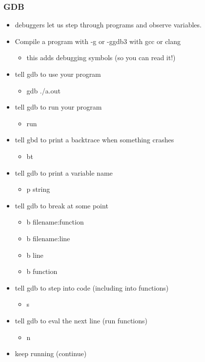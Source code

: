 \documentclass[11pt]{article}
\begin{document}
\subsubsection{GDB}
\label{sec:orgcde5e70}
\begin{itemize}
\item debuggers let us step through programs and observe variables.
\item Compile a program with -g or -ggdb3 with gcc or clang
\begin{itemize}
\item this adds debugging symbols (so you can read it!)
\end{itemize}
\item tell gdb to use your program
\begin{itemize}
\item gdb ./a.out
\end{itemize}
\item tell gdb to run your program 
\begin{itemize}
\item run
\end{itemize}
\item tell gbd to print a backtrace when something crashes
\begin{itemize}
\item bt
\end{itemize}
\item tell gdb to print a variable name
\begin{itemize}
\item p string
\end{itemize}
\item tell gdb to break at some point
\begin{itemize}
\item b filename:function
\item b filename:line
\item b line
\item b function
\end{itemize}
\item tell gdb to step into code (including into functions)
\begin{itemize}
\item s
\end{itemize}
\item tell gdb to eval the next line (run functions)
\begin{itemize}
\item n
\end{itemize}
\item keep running (continue)

\end{itemize}
\end{document}
